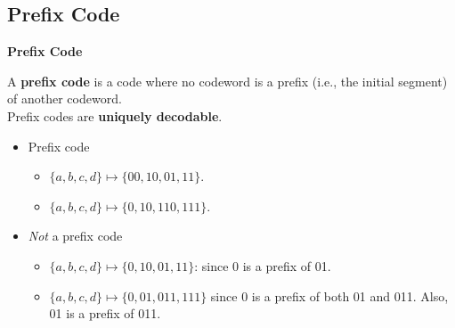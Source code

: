 \documentclass[compress]{beamer}        %
\makeatletter
\newcommand{\tcb}{\textcolor{beamer@blendedblue}}
\makeatother
\begin{document}
\subsection{Prefix Code}
\begin{frame}{\bf \tcb{Prefix Code}}

A {\bf prefix code} is a code where no codeword is a prefix (i.e., the initial segment) of another codeword.\\[0.3cm]

Prefix codes are {\bf uniquely decodable}.\\[0.3cm]


\begin{itemize}\itemsep0.8cm
\item Prefix code\\[0.2cm]
\begin{itemize}\itemsep0.4cm
\item $\{a,b,c,d\} \mapsto \{00,10,01,11\}$.
\item $\{a,b,c,d\} \mapsto \{0,10,110,111\}$.
\end{itemize}
\item \emph{Not} a prefix code\\[0.2cm]
\begin{itemize}\itemsep0.4cm
\item $\{a,b,c,d\} \mapsto \{0,10,01,11\}$: since 0 is a prefix of 01.
\item $\{a,b,c,d\} \mapsto \{0,01,011,111\}$ since 0 is a prefix of both 01 and 011. Also, 01 is a prefix of 011.
\end{itemize}
\end{itemize}

\end{frame}
\end{document}
